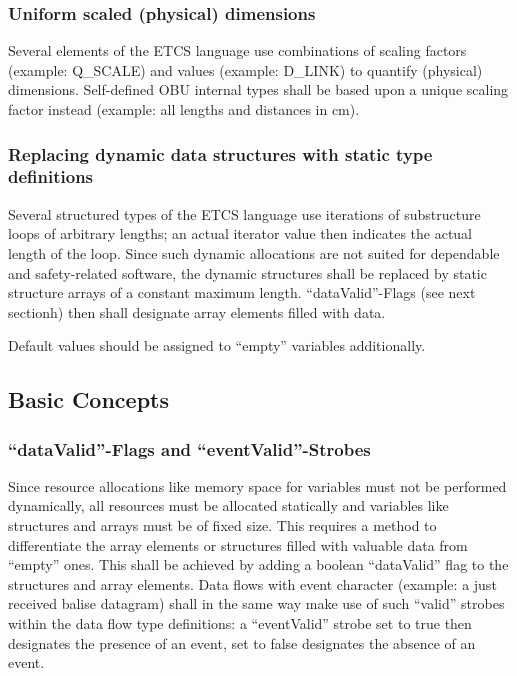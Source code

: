 \subsubsection{Uniform scaled (physical) dimensions}

Several elements of the ETCS language use combinations of scaling factors (example: Q\_SCALE) and values (example: D\_LINK) to quantify (physical) dimensions. 
Self-defined OBU internal types shall be based upon a unique scaling factor instead (example: all lengths and distances in cm).

\subsubsection{Replacing dynamic data structures with static type definitions}

Several structured types of the ETCS language use iterations of substructure loops of arbitrary lengths; an actual iterator value then indicates the actual length of the loop. 
Since such dynamic allocations are not suited for dependable and safety-related software, the dynamic structures shall be replaced by static structure arrays of a constant maximum length. 
“dataValid”-Flags (see next sectionh) then shall designate array elements filled with data.

Default values should be assigned to “empty” variables additionally.


\subsection{Basic Concepts}
\label{sec:BasicConcepts}

\subsubsection{"`dataValid"'-Flags and "`eventValid"'-Strobes}

Since resource allocations like memory space for variables must not be performed dynamically, all resources must be allocated statically and variables like structures and arrays must be of fixed size. This requires a method to differentiate the array elements or structures filled with valuable data from "`empty"' ones. This shall be achieved by adding a boolean “dataValid” flag to the structures and array elements. 
Data flows with event character (example: a just received balise datagram) shall in the same way make use of such “valid” strobes within the data flow type definitions: a “eventValid” strobe set to true then designates the presence of an event, set to false designates the absence of an event. 

